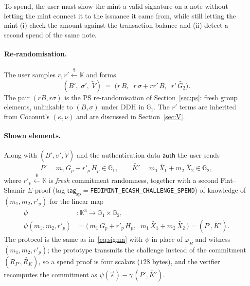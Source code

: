 \documentclass[10pt,a5paper]{article}
\newcommand{\K}[1]{#1}                      %
\newcommand{\Go}[1]{#1}                     %
\newcommand{\Gt}[1]{\tilde{#1}}             %
\newcommand{\K}[1]{{\color{ScalarCol}#1}}   %
\newcommand{\Go}[1]{{\color{GoneCol}#1}}    %
\newcommand{\Gt}[1]{{\color{GtwoCol}#1}}    %
\newcommand{\F}{\mathbb{K}}
\newcommand{\GG}[1]{\mathbb{G}_{#1}}
\newcommand{\auth}{\mathsf{auth}}
\newcommand{\dtag}{\mathsf{tag}}
\newcommand{\vv}[1]{\vec{#1}}
\newcommand{\sample}{\stackrel{\$}{\leftarrow}}
\begin{document}
To spend, the user must show the mint a valid signature on a note without
letting the mint connect it to the issuance it came from, while still letting
the mint (i) check the amount against the transaction balance and (ii) detect
a second spend of the same note.

\paragraph{Re-randomisation.}
The user samples $\K{r}, \K{r'} \sample \F$ and forms
\begin{equation}
  (\Go{B'},\; \Go{\sigma'},\; \Gt{V}) \;=\; \bigl(\K{r}\,\Go{B},\;\; \K{r}\,\Go{\sigma} + \K{r}\K{r'}\,\Go{B},\;\; \K{r'}\,\Gt{G_2}\bigr).
  \label{eq:rerand}
\end{equation}
The pair $(\K{r}\Go{B}, \K{r}\Go{\sigma})$ is the PS re-randomisation of
Section~\ref{sec:ps}: fresh group elements, unlinkable to $(\Go{B},\Go{\sigma})$
under DDH in $\GG{1}$. The $\K{r'}$ terms are inherited from Coconut's
$(\kappa,\nu)$ and are discussed in Section~\ref{sec:V}.

\paragraph{Shown elements.}
Along with $(\Go{B'},\Go{\sigma'},\Gt{V})$ and the authentication data
$\auth$ the user sends
\begin{equation}
  \Go{P'} = \K{m_1}\,\Go{G_p} + \K{r'_p}\,\Go{H_p} \in \GG{1},
  \qquad
  \Gt{K'} = \K{m_1}\,\Gt{X_1} + \K{m_2}\,\Gt{X_2} \in \GG{2},
  \label{eq:spendelems}
\end{equation}
where $\K{r'_p} \sample \F$ is \emph{fresh} commitment randomness, together with a
second Fiat--Shamir $\Sigma$-proof (tag
$\dtag_{\mathrm{sp}} = {}$\texttt{FEDIMINT\_\allowbreak ECASH\_\allowbreak CHALLENGE\_\allowbreak SPEND}) of knowledge of
$(\K{m_1},\K{m_2},\K{r'_p})$ for the linear map
\begin{equation}
\begin{aligned}
  \psi &: \F^3 \to \GG{1} \times \GG{2}, \\
  \psi(\K{m_1}, \K{m_2}, \K{r'_p}) &= \bigl(\, \K{m_1}\,\Go{G_p} + \K{r'_p}\,\Go{H_p},\;\; \K{m_1}\,\Gt{X_1} + \K{m_2}\,\Gt{X_2} \,\bigr) = (\Go{P'}, \Gt{K'}).
\end{aligned}
  \label{eq:psi}
\end{equation}
The protocol is the same as in~\eqref{eq:sigma} with $\psi$ in place of
$\varphi_{\Go{B}}$ and witness $(\K{m_1},\K{m_2},\K{r'_p})$; the prototype
transmits the challenge instead of the commitment $(\Go{R_{P'}},\Gt{R_K})$, so a
spend proof is four scalars ($128$ bytes), and the verifier recomputes the
commitment as $\psi(\vv{s}) - \K{\gamma}\,(\Go{P'},\Gt{K'})$.
\end{document}

